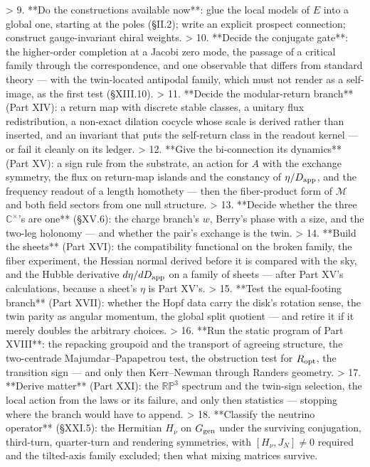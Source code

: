 > 9. **Do the constructions available now**: glue the local models of $E$ into a global one, starting at the poles (§II.2); write an explicit prospect connection; construct gauge-invariant chiral weights.
> 10. **Decide the conjugate gate**: the higher-order completion at a Jacobi zero mode, the passage of a critical family through the correspondence, and one observable that differs from standard theory — with the twin-located antipodal family, which must not render as a self-image, as the first test (§XIII.10).
> 11. **Decide the modular-return branch** (Part XIV): a return map with discrete stable classes, a unitary flux redistribution, a non-exact dilation cocycle whose scale is derived rather than inserted, and an invariant that puts the self-return class in the readout kernel — or fail it cleanly on its ledger.
> 12. **Give the bi-connection its dynamics** (Part XV): a sign rule from the substrate, an action for $A$ with the exchange symmetry, the flux on return-map islands and the constancy of $\eta/D_{\rm app}$, and the frequency readout of a length homothety — then the fiber-product form of $\mathcal M$ and both field sectors from one null structure.
> 13. **Decide whether the three $\mathbb C^\times$'s are one** (§XV.6): the charge branch's $w$, Berry's phase with a size, and the two-leg holonomy — and whether the pair's exchange is the twin.
> 14. **Build the sheets** (Part XVI): the compatibility functional on the broken family, the fiber experiment, the Hessian normal derived before it is compared with the sky, and the Hubble derivative $d\eta/dD_{\rm app}$ on a family of sheets — after Part XV's calculations, because a sheet's $\eta$ is Part XV's.
> 15. **Test the equal-footing branch** (Part XVII): whether the Hopf data carry the disk's rotation sense, the twin parity as angular momentum, the global split quotient — and retire it if it merely doubles the arbitrary choices.
> 16. **Run the static program of Part XVIII**: the repacking groupoid and the transport of agreeing structure, the two-centrade Majumdar–Papapetrou test, the obstruction test for $R_{\rm opt}$, the transition sign — and only then Kerr–Newman through Randers geometry.
> 17. **Derive matter** (Part XXI): the $\mathbb{RP}^3$ spectrum and the twin-sign selection, the local action from the laws or its failure, and only then statistics — stopping where the branch would have to append.
> 18. **Classify the neutrino operator** (§XXI.5): the Hermitian $H_\nu$ on $G_{\rm gen}$ under the surviving conjugation, third-turn, quarter-turn and rendering symmetries, with $[H_\nu,J_N]\neq0$ required and the tilted-axis family excluded; then what mixing matrices survive.

